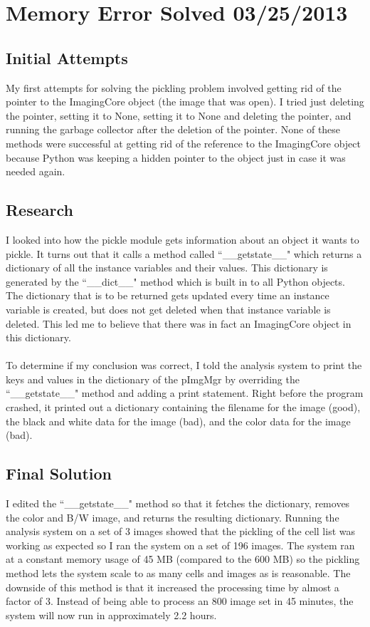 \documentclass[]{article}
\begin{document}
	\section{Memory Error Solved 03/25/2013}
		\subsection{Initial Attempts}
			My first attempts for solving the pickling problem involved getting rid of the pointer to the ImagingCore object (the image that was open). I tried just deleting the pointer, setting it to None, setting it to None and deleting the pointer, and running the garbage collector after the deletion of the pointer. None of these methods were successful at getting rid of the reference to the ImagingCore object because Python was keeping a hidden pointer to the object just in case it was needed again. 
		
		\subsection{Research}
			I looked into how the pickle module gets information about an object it wants to pickle. It turns out that it calls a method called ``\_\_getstate\_\_" which returns a dictionary of all the instance variables and their values. This dictionary is generated by the ``\_\_dict\_\_" method which is built in to all Python objects. The dictionary that is to be returned gets updated every time an instance variable is created, but does not get deleted when that instance variable is deleted. This led me to believe that there was in fact an ImagingCore object in this dictionary. \\
			\\
			To determine if my conclusion was correct, I told the analysis system to print the keys and values in the dictionary of the pImgMgr by overriding the ``\_\_getstate\_\_" method and adding a print statement. Right before the program crashed, it printed out a dictionary containing the filename for the image (good), the black and white data for the image (bad), and the color data for the image (bad). 
			
		\subsection{Final Solution}
			I edited the ``\_\_getstate\_\_" method so that it fetches the dictionary, removes the color and B/W image, and returns the resulting dictionary. Running the analysis system on a set of 3 images showed that the pickling of the cell list was working as expected so I ran the system on a set of 196 images. The system ran at a constant memory usage of 45 MB (compared to the 600 MB) so the pickling method lets the system scale to as many cells and images as is reasonable. The downside of this method is that it increased the processing time by almost a factor of 3. Instead of being able to process an 800 image set in 45 minutes, the system will now run in approximately 2.2 hours. 
			
\end{document}

